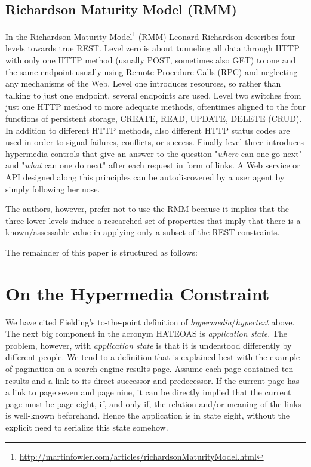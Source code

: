 \documentclass{acm_proc_article-sp}
\begin{document}
\subsection{Richardson Maturity Model (RMM)}\label{sec:rmm}
In the Richardson Maturity Model\footnote{\url{http://martinfowler.com/articles/richardsonMaturityModel.html}} (RMM) Leonard Richardson describes four levels towards true REST. Level zero is about tunneling all data through HTTP with only one HTTP method (usually POST, sometimes also GET) to one and the same endpoint usually using Remote Procedure Calls (RPC) and neglecting any mechanisms of the Web. Level one introduces resources, so rather than talking to just one endpoint, several endpoints are used. Level two switches from just one HTTP method to more adequate methods, oftentimes aligned to the four functions of persistent storage, CREATE, READ, UPDATE, DELETE (CRUD). In addition to different HTTP methods, also different HTTP status codes are used in order to signal failures, conflicts, or success. Finally level three introduces hypermedia controls that give an answer to the question "\textit{where} can one go next" and "\textit{what} can one do next" after each request in form of links. A Web service or API designed along this principles can be autodiscovered by a user agent by simply following her nose.

The authors, however, prefer not to use the RMM because it implies that the three lower levels induce a researched set of properties that imply that there is a known/assessable value in applying only a subset of the REST constraints.

The remainder of this paper is structured as follows: 

\section{On the Hypermedia Constraint}\label{sec:hateoas}
We have cited Fielding's to-the-point definition of \textit{hypermedia}/\textit{hypertext} above. The next big component in the acronym HATEOAS is \textit{application state}. The problem, however, with \textit{application state} is that it is understood differently by different people. We tend to a definition that is explained best with the example of pagination on a search engine results page. Assume each page contained ten results and a link to its direct successor and predecessor. If the current page has a link to page seven and page nine, it can be directly implied that the current page must be page eight, if, and only if, the relation and/or meaning of the links is well-known beforehand. Hence the application is in state eight, without the explicit need to serialize this state somehow.
\end{document}
